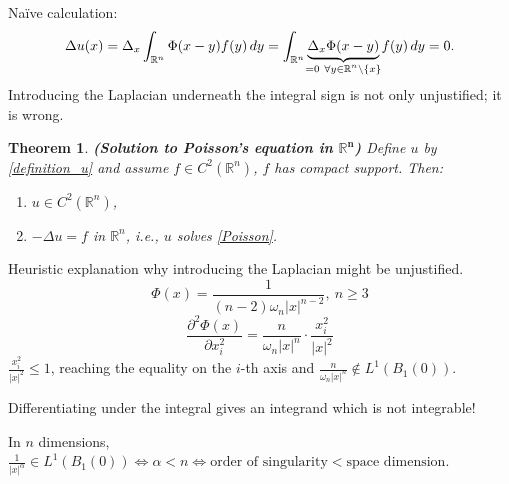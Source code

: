 \documentclass[12pt]{article}
\newtheorem{theorem}{Theorem}[section]
\theoremstyle{definition}
\begin{document}
Na\"ive calculation:
\[\Delta u(x)=\Delta_x\int_{\mathbb R^n}\Phi(x-y)f(y)\,dy=\int_{\mathbb R^n}\underbrace{\Delta_x\Phi(x-y)}_{\mathclap{=0\ \forall y\in\mathbb R^n\setminus\{x\}}}f(y)\,dy=0.\]
Introducing the Laplacian underneath the integral sign is not only unjustified; it is wrong.



\begin{theorem}\label{Poisson_sol}
\emph{\textbf{(Solution to Poisson's equation in $\boldsymbol{\mathbb R^n}$)}} Define $u$ by \eqref{definition_u} and assume $f\in C^2(\mathbb R^n)$, $f$ has compact support. Then:
\begin{enumerate}[label=(\roman*)]
\item $u\in C^2(\mathbb R^n)$,
\item $-\Delta u=f$ in $\mathbb R^n$, i.e., $u$ solves \eqref{Poisson}.
\end{enumerate}
\end{theorem}

Heuristic explanation why introducing the Laplacian might be unjustified.
\[\Phi(x)=\frac1{(n-2)\omega_n|x|^{n-2}},\ n\geq3\]
\[\frac{\partial^2\Phi(x)}{\partial x_i^2}=\frac n{\omega_n|x|^n}\cdot\frac{x_i^2}{|x|^2}\]
$\frac{x_i^2}{|x|^2}\leq1$, reaching the equality on the $i$-th axis and $\frac n{\omega_n|x|^n}\notin L^1(B_1(0))$.

Differentiating under the integral gives an integrand which is not integrable!

In $n$ dimensions, $\frac1{|x|^\alpha}\in L^1(B_1(0))\Leftrightarrow\alpha<n\Leftrightarrow\text{order of singularity}<\text{space dimension}$.
\end{document}
